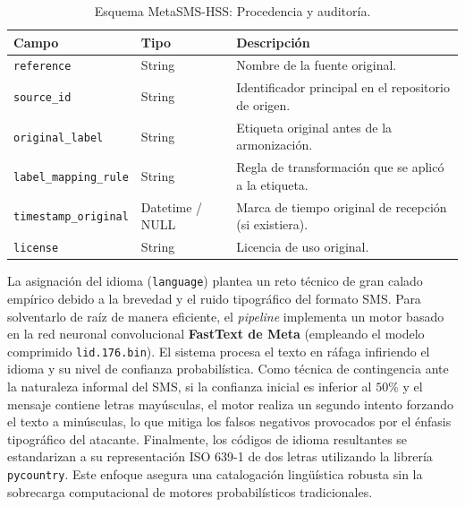 \begin{table}[htbp]
    \centering
    \caption{Esquema MetaSMS-HSS: Procedencia y auditoría.}
    \label{tab:esquema_trazabilidad}
    \small
    \begin{tabular}{llp{7cm}}
        \toprule
        \textbf{Campo} & \textbf{Tipo} & \textbf{Descripción} \\
        \midrule
        \texttt{reference} & String & Nombre de la fuente original. \\
        \texttt{source\_id} & String & Identificador principal en el repositorio de origen. \\
        \texttt{original\_label} & String & Etiqueta original antes de la armonización. \\
        \texttt{label\_mapping\_rule} & String & Regla de transformación que se aplicó a la etiqueta. \\
        \texttt{timestamp\_original} & Datetime / NULL & Marca de tiempo original de recepción (si existiera). \\
        \texttt{license} & String & Licencia de uso original. \\
        \bottomrule
    \end{tabular}
\end{table}

La asignación del idioma (\texttt{language}) plantea un reto técnico de gran calado empírico debido a la brevedad y el ruido tipográfico del formato SMS. Para solventarlo de raíz de manera eficiente, el \textit{pipeline} implementa un motor basado en la red neuronal convolucional \textbf{FastText de Meta} (empleando el modelo comprimido \texttt{lid.176.bin}). El sistema procesa el texto en ráfaga infiriendo el idioma y su nivel de confianza probabilística. Como técnica de contingencia ante la naturaleza informal del SMS, si la confianza inicial es inferior al $50\%$ y el mensaje contiene letras mayúsculas, el motor realiza un segundo intento forzando el texto a minúsculas, lo que mitiga los falsos negativos provocados por el énfasis tipográfico del atacante. Finalmente, los códigos de idioma resultantes se estandarizan a su representación ISO 639-1 de dos letras utilizando la librería \texttt{pycountry}. Este enfoque asegura una catalogación lingüística robusta sin la sobrecarga computacional de motores probabilísticos tradicionales.

